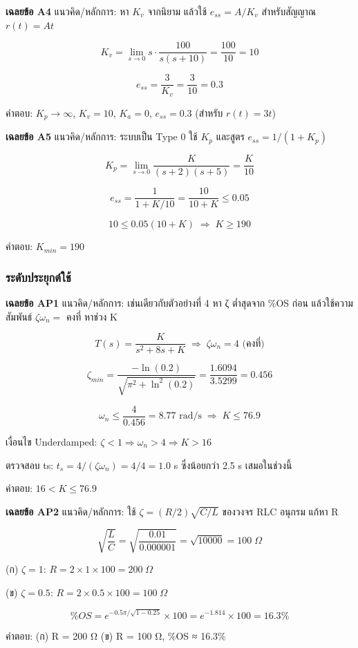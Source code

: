 \textbf{เฉลยข้อ A4}
แนวคิด/หลักการ: หา $K_v$ จากนิยาม แล้วใช้ $e_{ss}=A/K_v$ สำหรับสัญญาณ $r(t)=At$

\[
K_v=\lim_{s\to0}s\cdot\frac{100}{s(s+10)}=\frac{100}{10}=10
\]

\[
e_{ss}=\frac{3}{K_v}=\frac{3}{10}=0.3
\]

คำตอบ: $K_p\to\infty$, $K_v=10$, $K_a=0$, $e_{ss}=0.3$ (สำหรับ $r(t)=3t$)

\textbf{เฉลยข้อ A5}
แนวคิด/หลักการ: ระบบเป็น Type 0 ใช้ $K_p$ และสูตร $e_{ss}=1/(1+K_p)$

\[
K_p=\lim_{s\to0}\frac{K}{(s+2)(s+5)}=\frac{K}{10}
\]

\[
e_{ss}=\frac{1}{1+K/10}=\frac{10}{10+K}\le0.05
\]

\[
10\le0.05(10+K) \;\Rightarrow\; K\ge190
\]

คำตอบ: $K_{min}=190$

\subsubsection{ระดับประยุกต์ใช้}

\textbf{เฉลยข้อ AP1}
แนวคิด/หลักการ: เช่นเดียวกับตัวอย่างที่ 4 หา ζ ต่ำสุดจาก \%OS ก่อน แล้วใช้ความสัมพันธ์ $\zeta\omega_n=$ คงที่ หาช่วง K

\[
T(s)=\frac{K}{s^2+8s+K} \;\Rightarrow\; \zeta\omega_n=4 \text{ (คงที่)}
\]

\[
\zeta_{min}=\frac{-\ln(0.2)}{\sqrt{\pi^2+\ln^2(0.2)}}=\frac{1.6094}{3.5299}=0.456
\]

\[
\omega_n\le\frac{4}{0.456}=8.77 \text{ rad/s} \;\Rightarrow\; K\le76.9
\]

เงื่อนไข Underdamped: $\zeta<1\Rightarrow\omega_n>4\Rightarrow K>16$

ตรวจสอบ ts: $t_s=4/(\zeta\omega_n)=4/4=1.0$ s ซึ่งน้อยกว่า 2.5 s เสมอในช่วงนี้

คำตอบ: $16 < K \le 76.9$

\textbf{เฉลยข้อ AP2}
แนวคิด/หลักการ: ใช้ $\zeta=(R/2)\sqrt{C/L}$ ของวงจร RLC อนุกรม แก้หา R

\[
\sqrt{\frac{L}{C}}=\sqrt{\frac{0.01}{0.000001}}=\sqrt{10000}=100 \;\Omega
\]

(ก) $\zeta=1$: $R=2\times1\times100=200\;\Omega$

(ข) $\zeta=0.5$: $R=2\times0.5\times100=100\;\Omega$

\[
\%OS=e^{-0.5\pi/\sqrt{1-0.25}}\times100=e^{-1.814}\times100=16.3\%
\]

คำตอบ: (ก) R = 200 Ω (ข) R = 100 Ω, \%OS ≈ 16.3\%

